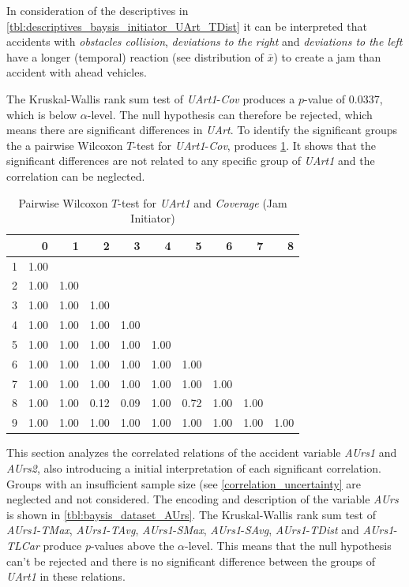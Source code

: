 In consideration of the descriptives in \cref{tbl:descriptives_baysis_initiator_UArt_TDist} it can be interpreted that accidents with \textit{obstacles collision}, \textit{deviations to the right} and \textit{deviations to the left} have a longer (temporal) reaction (see distribution of $\bar{x}$) to create a jam than accident with ahead vehicles.

The Kruskal-Wallis rank sum test of \textit{UArt1}-\textit{Cov} produces a $p$-value of 0.0337, which is below $\alpha$-level. The null hypothesis can therefore be rejected, which means there are significant differences in \textit{UArt}. To identify the significant groups the a pairwise Wilcoxon $T$-test for \textit{UArt1}-\textit{Cov}, produces \cref*{tbl:wilcoxon_baysis_initiator_UArt_Cov}. It shows that the significant differences are not related to any specific group of \textit{UArt1} and the correlation can be neglected.
\begin{table}[ht]
	\tiny
	\centering
    \begin{tabular}{rrrrrrrrrr}
        \toprule
          & 0 & 1 & 2 & 3 & 4 & 5 & 6 & 7 & 8 \\ 
        \midrule
        1 & 1.00 &  &  &  &  &  &  &  &  \\ 
        2 & 1.00 & 1.00 &  &  &  &  &  &  &  \\ 
        3 & 1.00 & 1.00 & 1.00 &  &  &  &  &  &  \\ 
        4 & 1.00 & 1.00 & 1.00 & 1.00 &  &  &  &  &  \\ 
        5 & 1.00 & 1.00 & 1.00 & 1.00 & 1.00 &  &  &  &  \\ 
        6 & 1.00 & 1.00 & 1.00 & 1.00 & 1.00 & 1.00 &  &  &  \\ 
        7 & 1.00 & 1.00 & 1.00 & 1.00 & 1.00 & 1.00 & 1.00 &  &  \\ 
        8 & 1.00 & 1.00 & 0.12 & 0.09 & 1.00 & 0.72 & 1.00 & 1.00 &  \\ 
        9 & 1.00 & 1.00 & 1.00 & 1.00 & 1.00 & 1.00 & 1.00 & 1.00 & 1.00 \\ 
        \bottomrule
      \end{tabular}
    \caption{Pairwise Wilcoxon $T$-test for \textit{UArt1} and \textit{Coverage} (Jam Initiator)}
    \label{tbl:wilcoxon_baysis_initiator_UArt_Cov}
\end{table}

This section analyzes the correlated relations of the accident variable \textit{AUrs1} and \textit{AUrs2}, also introducing a initial interpretation of each significant correlation. Groups with an insufficient sample size (see \cref{correlation_uncertainty} are neglected and not considered. The encoding and description of the variable \textit{AUrs} is shown in \cref{tbl:baysis_dataset_AUrs}. The Kruskal-Wallis rank sum test of \textit{AUrs1}-\textit{TMax}, \textit{AUrs1}-\textit{TAvg}, \textit{AUrs1}-\textit{SMax}, \textit{AUrs1}-\textit{SAvg}, \textit{AUrs1}-\textit{TDist} and \textit{AUrs1}-\textit{TLCar} produce $p$-values above the $\alpha$-level. This means that the null hypothesis can't be rejected and there is no significant difference between the groups of \textit{UArt1} in these relations. 

